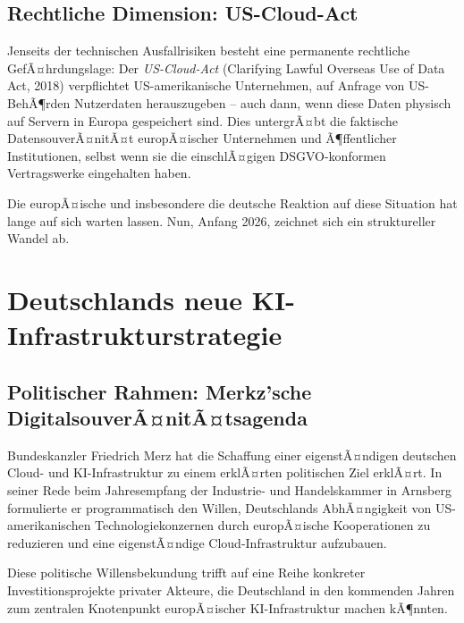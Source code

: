 ﻿\documentclass[12pt, a4paper, openany]{report}
\begin{document}
\subsection{Rechtliche Dimension: US-Cloud-Act}

Jenseits der technischen Ausfallrisiken besteht eine permanente rechtliche
GefÃ¤hrdungslage: Der \emph{US-Cloud-Act} (Clarifying Lawful Overseas Use
of Data Act, 2018) verpflichtet US-amerikanische Unternehmen, auf Anfrage
von US-BehÃ¶rden Nutzerdaten herauszugeben -- auch dann, wenn diese Daten
physisch auf Servern in Europa gespeichert sind. Dies untergrÃ¤bt die
faktische DatensouverÃ¤nitÃ¤t europÃ¤ischer Unternehmen und Ã¶ffentlicher
Institutionen, selbst wenn sie die einschlÃ¤gigen DSGVO-konformen
Vertragswerke eingehalten haben.

Die europÃ¤ische und insbesondere die deutsche Reaktion auf diese Situation
hat lange auf sich warten lassen. Nun, Anfang 2026, zeichnet sich ein
struktureller Wandel ab.

\section{Deutschlands neue KI-Infrastrukturstrategie}
\label{sec:deutschland_strategie}

\subsection{Politischer Rahmen: Merkz'sche DigitalsouverÃ¤nitÃ¤tsagenda}

Bundeskanzler Friedrich Merz hat die Schaffung einer eigenstÃ¤ndigen deutschen
Cloud- und KI-Infrastruktur zu einem erklÃ¤rten politischen Ziel erklÃ¤rt.
In seiner Rede beim Jahresempfang der Industrie- und Handelskammer in Arnsberg
formulierte er programmatisch den Willen, Deutschlands AbhÃ¤ngigkeit von US-amerikanischen
Technologiekonzernen durch europÃ¤ische Kooperationen zu reduzieren
und eine eigenstÃ¤ndige Cloud-Infrastruktur aufzubauen.

Diese politische Willensbekundung trifft auf eine Reihe konkreter
Investitionsprojekte privater Akteure, die Deutschland in den kommenden Jahren
zum zentralen Knotenpunkt europÃ¤ischer KI-Infrastruktur machen kÃ¶nnten.
\end{document}
